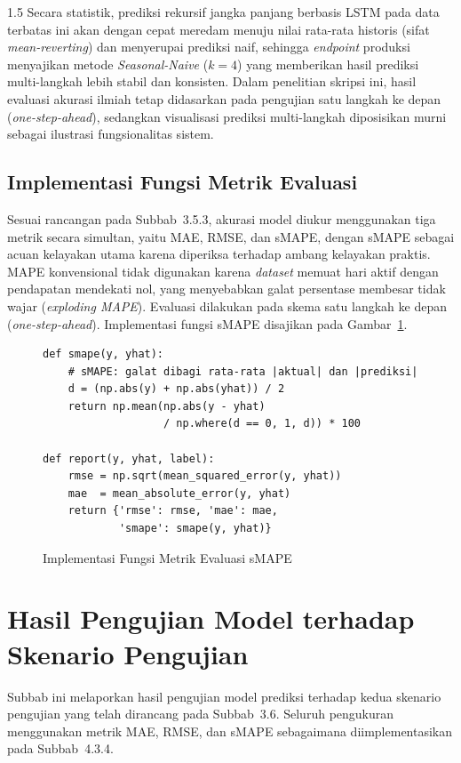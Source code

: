 \documentclass[12pt, a4paper, onecolumn, oneside]{report}
\begin{document}
\begin{spacing}{1.5}
Secara statistik, prediksi rekursif jangka panjang berbasis LSTM pada data terbatas ini akan dengan cepat meredam menuju nilai rata-rata historis (sifat \textit{mean-reverting}) dan menyerupai prediksi naif, sehingga \textit{endpoint} produksi menyajikan metode \textit{Seasonal-Naive} ($k=4$) yang memberikan hasil prediksi multi-langkah lebih stabil dan konsisten. Dalam penelitian skripsi ini, hasil evaluasi akurasi ilmiah tetap didasarkan pada pengujian satu langkah ke depan (\textit{one-step-ahead}), sedangkan visualisasi prediksi multi-langkah diposisikan murni sebagai ilustrasi fungsionalitas sistem.

\subsection{Implementasi Fungsi Metrik Evaluasi}
Sesuai rancangan pada Subbab~3.5.3, akurasi model diukur menggunakan tiga metrik secara simultan, yaitu MAE, RMSE, dan sMAPE, dengan sMAPE sebagai acuan kelayakan utama karena diperiksa terhadap ambang kelayakan praktis. MAPE konvensional tidak digunakan karena \textit{dataset} memuat hari aktif dengan pendapatan mendekati nol, yang menyebabkan galat persentase membesar tidak wajar (\textit{exploding MAPE}). Evaluasi dilakukan pada skema satu langkah ke depan (\textit{one-step-ahead}). Implementasi fungsi sMAPE disajikan pada Gambar~\ref{fig:metrics}.

\begin{figure}[H]
\begin{lstlisting}
def smape(y, yhat):
    # sMAPE: galat dibagi rata-rata |aktual| dan |prediksi|
    d = (np.abs(y) + np.abs(yhat)) / 2
    return np.mean(np.abs(y - yhat)
                   / np.where(d == 0, 1, d)) * 100

def report(y, yhat, label):
    rmse = np.sqrt(mean_squared_error(y, yhat))
    mae  = mean_absolute_error(y, yhat)
    return {'rmse': rmse, 'mae': mae,
            'smape': smape(y, yhat)}
\end{lstlisting}
\caption{Implementasi Fungsi Metrik Evaluasi sMAPE}
\label{fig:metrics}
\end{figure}

\section{Hasil Pengujian Model terhadap Skenario Pengujian}
Subbab ini melaporkan hasil pengujian model prediksi terhadap kedua skenario pengujian yang telah dirancang pada Subbab~3.6. Seluruh pengukuran menggunakan metrik MAE, RMSE, dan sMAPE sebagaimana diimplementasikan pada Subbab~4.3.4.

\end{spacing}
\end{document}
